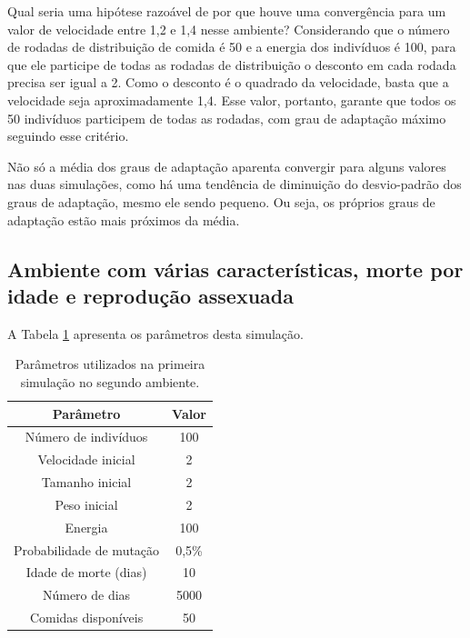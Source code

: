 \documentclass[10pt,brazil,english]{article}
\begin{document}
            Qual seria uma hipótese razoável de por que houve uma convergência para um valor de velocidade entre 1,2 e 1,4 nesse ambiente?  Considerando que o número de rodadas de distribuição de comida é 50 e a energia dos indivíduos é 100, para que ele participe de todas as rodadas de distribuição o desconto em cada rodada precisa ser igual a 2.  Como o desconto é o quadrado da velocidade, basta que a velocidade seja aproximadamente 1,4. Esse valor, portanto, garante que todos os 50 indivíduos participem de  todas  as  rodadas,  com  grau  de adaptação  máximo seguindo esse critério.
            
            Não só a média dos graus de adaptação aparenta convergir para alguns valores nas duas simulações, como há uma tendência de diminuição do desvio-padrão dos graus de adaptação, mesmo ele sendo pequeno. Ou seja, os próprios graus de adaptação estão mais próximos da média.
            
        \subsection{Ambiente com várias características, morte por idade e reprodução assexuada}
        
            A Tabela \ref{Tab3} apresenta os parâmetros desta simulação.
            
            \begin{table}[!hbtp]
                \centering
                \caption{Parâmetros utilizados na primeira simulação no segundo ambiente.}
                \label{Tab3}
                \begin{tabular}{c|c}
                    \hline
                    \textbf{Parâmetro}          & \textbf{Valor}    \\ \hline
                    Número de indivíduos        & 100               \\ \hline
                    Velocidade inicial          & 2                 \\ \hline
                    Tamanho inicial             & 2                 \\ \hline
                    Peso inicial                & 2                 \\ \hline
                    Energia                     & 100               \\ \hline
                    Probabilidade de mutação    & 0,5\%             \\ \hline
                    Idade de morte (dias)       & 10                \\ \hline
                    Número de dias              & 5000              \\ \hline
                    Comidas disponíveis         & 50                \\ \hline
                \end{tabular}
            \end{table}
            
\end{document}
